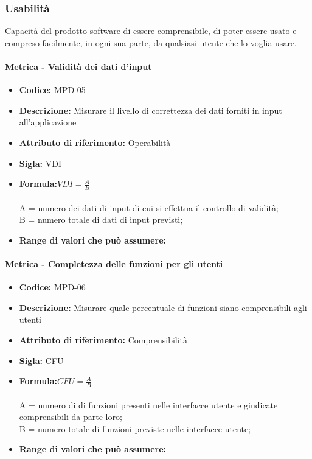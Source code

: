 \subsubsection{Usabilità} 
Capacità del prodotto software di essere comprensibile, di poter essere usato e compreso facilmente, in ogni sua parte, da qualsiasi utente che lo voglia usare. \\

	 \paragraph{Metrica - Validità dei dati d'input} 
	    \begin{itemize}
          \item  \textbf{Codice: } MPD-05
           \item \textbf{Descrizione:} Misurare il livello di correttezza dei dati forniti in input all'applicazione
         \item   \textbf{Attributo di riferimento:} Operabilità
          \item  \textbf{Sigla:} VDI
         \item   \textbf{Formula:}\begin{math} VDI = \frac{A}{B}\end{math}\\ \\
             A = numero dei dati di input di cui si effettua il controllo di validità;\\
             B = numero totale di dati di input previsti;
           \item  \textbf{Range di valori che può assumere:}
           \end{itemize}
             
                \paragraph{Metrica - Completezza delle funzioni per gli utenti} 
                   \begin{itemize}
         \item   \textbf{Codice: } MPD-06
         \item   \textbf{Descrizione:} Misurare quale percentuale di funzioni siano comprensibili agli utenti
         \item   \textbf{Attributo di riferimento:} Comprensibilità
          \item  \textbf{Sigla:} CFU
          \item  \textbf{Formula:}\begin{math}CFU = \frac{A}{B}\end{math}\\ \\
             A = numero di di funzioni presenti nelle interfacce utente e giudicate comprensibili da parte loro;\\
              B = numero totale di funzioni previste nelle interfacce utente;
        \item   \textbf{Range di valori che può assumere:}
        \end{itemize}
           
